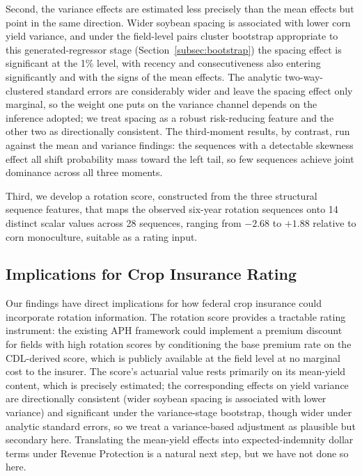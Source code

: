 \documentclass[12pt,letterpaper]{article}
\theoremstyle{remark}
\theoremstyle{remark}
\theoremstyle{plain}
\theoremstyle{definition}
\begin{document}
Second, the variance effects are estimated less precisely than the mean effects but point in the same direction. Wider soybean spacing is associated with lower corn yield variance, and under the field-level pairs cluster bootstrap appropriate to this generated-regressor stage (Section~\ref{subsec:bootstrap}) the spacing effect is significant at the 1\% level, with recency and consecutiveness also entering significantly and with the signs of the mean effects. The analytic two-way-clustered standard errors are considerably wider and leave the spacing effect only marginal, so the weight one puts on the variance channel depends on the inference adopted; we treat spacing as a robust risk-reducing feature and the other two as directionally consistent. The third-moment results, by contrast, run against the mean and variance findings: the sequences with a detectable skewness effect all shift probability mass toward the left tail, so few sequences achieve joint dominance across all three moments.

Third, we develop a rotation score, constructed from the three structural sequence features, that maps the observed six-year rotation sequences onto 14 distinct scalar values across 28 sequences, ranging from $-2.68$ to $+1.88$ relative to corn monoculture, suitable as a rating input.

\subsection{\label{subsec:implications}Implications for Crop Insurance Rating}

Our findings have direct implications for how federal crop insurance could incorporate rotation information. The rotation score provides a tractable rating instrument: the existing APH framework could implement a premium discount for fields with high rotation scores by conditioning the base premium rate on the CDL-derived score, which is publicly available at the field level at no marginal cost to the insurer. The score's actuarial value rests primarily on its mean-yield content, which is precisely estimated; the corresponding effects on yield variance are directionally consistent (wider soybean spacing is associated with lower variance) and significant under the variance-stage bootstrap, though wider under analytic standard errors, so we treat a variance-based adjustment as plausible but secondary here. Translating the mean-yield effects into expected-indemnity dollar terms under Revenue Protection is a natural next step, but we have not done so here.
\end{document}
